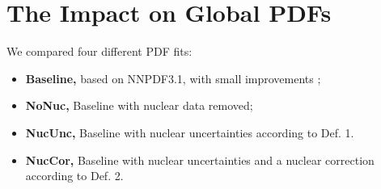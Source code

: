 \section{The Impact on Global PDFs} \label{sec:impact}
%
We compared four different PDF fits:
\begin{itemize}
\item \textbf{Baseline, } based on NNPDF3.1, with small improvements \cite{Ball:2018odr};
\item \textbf{NoNuc, } Baseline with nuclear data removed;
\item \textbf{NucUnc, } Baseline with nuclear uncertainties according to Def. 1.
\item \textbf{NucCor, } Baseline with nuclear uncertainties and a nuclear correction according to Def. 2.
\end{itemize}
